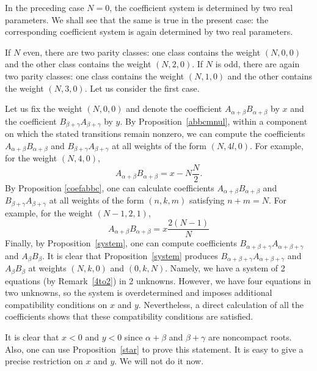 \documentclass[twoside,a4paper,12pt]{article}
\theoremstyle{definition}
\begin{document}
In the preceding case $N=0$, the coefficient system is determined by two real
parameters. We shall see that the same is true in the present case: the
corresponding coefficient system is again determined by two real parameters.

If $N$ even, there are two parity classes: one class contains the weight
$(N,0,0)$ and the other class contains the weight $(N,2,0)$.
If $N$ is odd, there are again two parity classes: one class contains the weight
$(N,1,0)$ and the other contains the weight $(N,3,0)$.
Let us consider the first case.

Let us fix the weight $(N,0,0)$ and denote the coefficient
$A_{\alpha+\beta}B_{\alpha+\beta}$ by $x$ and the coefficient
$B_{\beta+\gamma}A_{\beta+\gamma}$ by $y$. By Proposition~\ref{abbcmnul},
within a component on which the stated transitions remain nonzero,
we can compute the coefficients $A_{\alpha+\beta}B_{\alpha+\beta}$ and
$B_{\beta+\gamma}A_{\beta+\gamma}$ at all weights of the form $(N,4l,0)$.
For example, for the weight $(N,4,0)$,
\begin{equation*}
	A_{\alpha+\beta}B_{\alpha+\beta}=x-N\frac N2.
\end{equation*}
By Proposition \ref{coefabbc}, one can calculate coefficients
$A_{\alpha+\beta}B_{\alpha+\beta}$ and $B_{\beta+\gamma}A_{\beta+\gamma}$
at all weights of the form $(n,k,m)$ satisfying $n+m=N$. For example,
for the weight $(N-1,2,1)$,
\begin{equation*}
	A_{\alpha+\beta}B_{\alpha+\beta}=x\frac{2(N-1)}N
\end{equation*}
Finally, by Proposition~\ref{system}, one can compute coefficients
$B_{\alpha+\beta+\gamma}A_{\alpha+\beta+\gamma}$ and $A_\beta B_\beta$.
It is clear that Proposition~\ref{system} produces
$B_{\alpha+\beta+\gamma}A_{\alpha+\beta+\gamma}$ and $A_\beta B_\beta$
at weights $(N,k,0)$ and $(0,k,N)$.
Namely, we have a system of 2 equations (by Remark~\ref{4to2}) in 2 unknowns.
However, we have four equations in two unknowns, so the system is
overdetermined and imposes additional compatibility conditions on $x$ and
$y$. Nevertheless, a direct calculation of all the coefficients shows that
these compatibility conditions are satisfied.

It is clear that $x<0$ and $y<0$ since $\alpha+\beta$ and $\beta+\gamma$ are
noncompact roots. Also, one can use Proposition~\ref{star} to prove this
statement. It is easy to give a precise restriction on $x$ and $y$. We will not
do it now.
\end{document}
